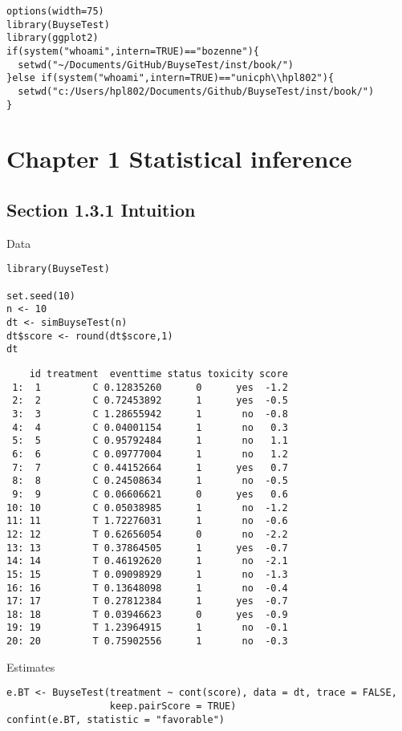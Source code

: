 \documentclass[12pt]{article}
\date{\today}
\title{}
\begin{document}
\lstset{language=r,label= ,caption= ,captionpos=b,numbers=none}
\begin{lstlisting}
options(width=75)
library(BuyseTest)
library(ggplot2)
if(system("whoami",intern=TRUE)=="bozenne"){
  setwd("~/Documents/GitHub/BuyseTest/inst/book/")
}else if(system("whoami",intern=TRUE)=="unicph\\hpl802"){
  setwd("c:/Users/hpl802/Documents/Github/BuyseTest/inst/book/")
}
\end{lstlisting}

\section{Chapter 1 Statistical inference}
\label{sec:orga589b82}
\subsection{Section 1.3.1 Intuition}
\label{sec:orgc0e1326}

Data
\lstset{language=r,label= ,caption= ,captionpos=b,numbers=none}
\begin{lstlisting}
library(BuyseTest)

set.seed(10)
n <- 10
dt <- simBuyseTest(n)
dt$score <- round(dt$score,1)
dt
\end{lstlisting}

\begin{verbatim}
    id treatment  eventtime status toxicity score
 1:  1         C 0.12835260      0      yes  -1.2
 2:  2         C 0.72453892      1      yes  -0.5
 3:  3         C 1.28655942      1       no  -0.8
 4:  4         C 0.04001154      1       no   0.3
 5:  5         C 0.95792484      1       no   1.1
 6:  6         C 0.09777004      1       no   1.2
 7:  7         C 0.44152664      1      yes   0.7
 8:  8         C 0.24508634      1       no  -0.5
 9:  9         C 0.06606621      0      yes   0.6
10: 10         C 0.05038985      1       no  -1.2
11: 11         T 1.72276031      1       no  -0.6
12: 12         T 0.62656054      0       no  -2.2
13: 13         T 0.37864505      1      yes  -0.7
14: 14         T 0.46192620      1       no  -2.1
15: 15         T 0.09098929      1       no  -1.3
16: 16         T 0.13648098      1       no  -0.4
17: 17         T 0.27812384      1      yes  -0.7
18: 18         T 0.03946623      0      yes  -0.9
19: 19         T 1.23964915      1       no  -0.1
20: 20         T 0.75902556      1       no  -0.3
\end{verbatim}

Estimates
\lstset{language=r,label= ,caption= ,captionpos=b,numbers=none}
\begin{lstlisting}
e.BT <- BuyseTest(treatment ~ cont(score), data = dt, trace = FALSE,
                  keep.pairScore = TRUE)
confint(e.BT, statistic = "favorable")
\end{lstlisting}
\end{document}
